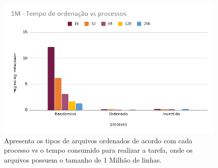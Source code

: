 \documentclass[12pt]{article}
\begin{document}
\begin{table}[]
\centering

\label{tab:hpctest}
\caption{Apresenta a quantidade de processadores disponíveis no cluster, bem como a capacidade de cada nó em realizar os cálculos.}
\end{table}
    
    
    \begin{figure}[!htb]
         \centering
         \includegraphics[scale=.5]{chart/chart1.png}
         \caption{Apresenta os tipos de arquivos ordenados de acordo com cada processo vs o tempo consumido para realizar a tarefa, onde os arquivos possuem o tamanho de 1 Milhão de linhas.}
         \label{img:chart1}
    \end{figure}
   
\end{document}
